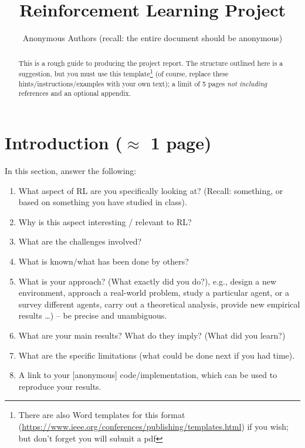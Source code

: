 \documentclass[journal, a4paper]{IEEEtran}
\begin{document}
\title{Reinforcement Learning Project}
\author{Anonymous Authors (recall: the entire document should be anonymous)}
\maketitle

\begin{abstract}
	This is a rough guide to producing the project report. 
	The structure outlined here is a suggestion, but you must use this template\footnote{There are also Word templates for this format (\url{https://www.ieee.org/conferences/publishing/templates.html}) if you wish; but don't forget you will submit a pdf} (of course, replace these hints/instructions/examples with your own text); a limit of 5 pages \emph{not including} references and an optional appendix. 
\end{abstract}

\section{Introduction ($\approx$ 1 page)}
\label{sec:intro}

In this section, answer the following: 

\begin{enumerate}
	\item What aspect of RL are you specifically looking at? (Recall: something, or based on something you have studied in class). 
	\item Why is this aspect interesting / relevant to RL?
	\item What are the challenges involved?  
	\item What is known/what has been done by others?
	\item \label{item:approach} What is your approach? (What exactly did you do?), e.g., design a new environment, approach a real-world problem, study a particular agent, or a survey different agents, carry out a theoretical analysis, provide new empirical results \ldots) -- be precise and unambiguous. 
	\item What are your main results? What do they imply? (What did you learn?)
	\item What are the specific limitations (what could be done next if you had time). 
	\item A link to your [anonymous] code/implementation, which can be used to reproduce your results. 
\end{enumerate}
\end{document}
